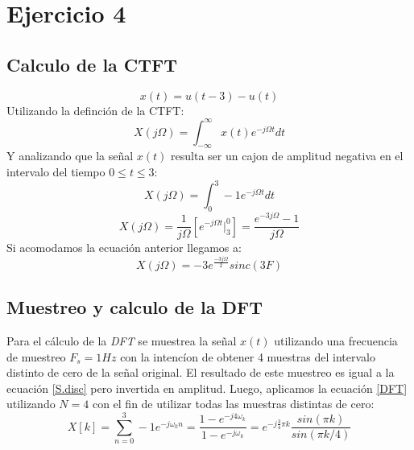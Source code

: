 \documentclass[11pt,a4paper]{article}
\begin{document}
\section{Ejercicio 4}

\subsection{Calculo de la CTFT}
\begin{equation}
    x(t)=u(t-3)-u(t)
\end{equation}
Utilizando la definción de la CTFT:
\begin{equation}
    X(j\Omega)=\int_{-\infty}^{\infty} x(t)e^{-j\Omega t}dt
\end{equation}
Y analizando que la señal $x(t)$ resulta ser un cajon de amplitud negativa en el intervalo del tiempo $0\leq t \leq 3$:
\begin{equation}
    X(j\Omega)=\int_{0}^{3} -1e^{-j\Omega t}dt
\end{equation}
\begin{equation}
    X(j\Omega)=\frac{1}{j\Omega} \left[e^{-j\Omega t} \vert_{3}^{0}\right] = \frac{e^{-3j\Omega} - 1}{j\Omega}
\end{equation}
Si acomodamos la ecuación anterior llegamos a:
\begin{equation}
    X(j\Omega) = -3e^{\frac{-3j\Omega}{2}} sinc(3F)
\end{equation}
\subsection{Muestreo y calculo de la DFT}
Para el cálculo de la \textit{DFT} se muestrea la señal $x(t)$ utilizando una frecuencia de muestreo $F_s=1Hz$ con la intencíon de obtener 4 muestras del intervalo distinto de cero de la señal original. El resultado de
este muestreo es igual a la ecuación \ref{S.disc} pero invertida en amplitud. Luego, aplicamos la ecuación \ref{DFT} utilizando $N=4$ con el fin de utilizar todas las muestras distintas de cero:
\begin{equation}
    X[k]=\sum_{n=0}^{3}-1e^{-j\omega_k n} = \frac{1 - e^{-j4\omega_k}}{1-e^{-j\omega_k}} = e^{-j\frac{3}{4}\pi k} \frac{sin(\pi k)}{sin(\pi k/4)}
\end{equation} 
\end{document}
